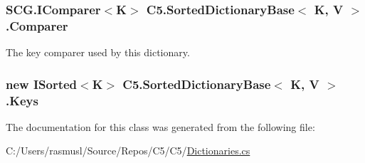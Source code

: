 \subsubsection[{Comparer}]{\setlength{\rightskip}{0pt plus 5cm}S\+C\+G.\+I\+Comparer$<$K$>$ {\bf C5.\+Sorted\+Dictionary\+Base}$<$ K, V $>$.Comparer\hspace{0.3cm}{\ttfamily [get]}}\label{class_c5_1_1_sorted_dictionary_base_a0fedf269f1b51cf8b0ed3a46227936ac}


The key comparer used by this dictionary. 

\hypertarget{class_c5_1_1_sorted_dictionary_base_ab1fc4a8d9ff1f315eafca20b17f6ca1d}{}
\subsubsection[{Keys}]{\setlength{\rightskip}{0pt plus 5cm}new {\bf I\+Sorted}$<$K$>$ {\bf C5.\+Sorted\+Dictionary\+Base}$<$ K, V $>$.Keys\hspace{0.3cm}{\ttfamily [get]}}\label{class_c5_1_1_sorted_dictionary_base_ab1fc4a8d9ff1f315eafca20b17f6ca1d}






The documentation for this class was generated from the following file\+:\begin{DoxyCompactItemize}
\item 
C\+:/\+Users/rasmusl/\+Source/\+Repos/\+C5/\+C5/\hyperlink{_dictionaries_8cs}{Dictionaries.\+cs}\end{DoxyCompactItemize}
